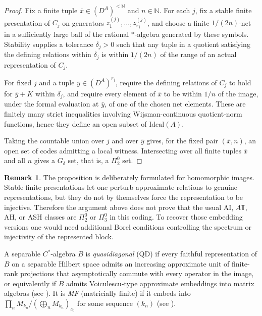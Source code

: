 \documentclass[12pt,fleqn,a4paper]{amsart}
\numberwithin{equation}{section}
\theoremstyle{definition}
\newtheorem{remark}[theorem]{Remark}
\newcommand{\N}{\mathbb{N}}
\newcommand{\Ideal}{\mathrm{Ideal}}
\begin{document}
\begin{proof}
Fix a finite tuple $\bar x\in(D^A)^{<\N}$ and $n\in\N$.  For each $j$, fix a stable
finite presentation of $C_j$ on generators $z^{(j)}_1,\dots,z^{(j)}_{r_j}$, and choose a
finite $1/(2n)$-net in a sufficiently large ball of the rational $*$-algebra generated
by these symbols.  Stability supplies a tolerance $\delta_j>0$ such that any tuple in a
quotient satisfying the defining relations within $\delta_j$ is within $1/(2n)$ of the
range of an actual representation of $C_j$.

For fixed $j$ and a tuple $\bar y\in(D^A)^{r_j}$, require the defining relations of
$C_j$ to hold for $\bar y+K$ within $\delta_j$, and require every element of $\bar x$ to
be within $1/n$ of the image, under the formal evaluation at $\bar y$, of one of the
chosen net elements.  These are finitely many strict inequalities involving
Wijsman-continuous quotient-norm functions, hence they define an open subset of
$\Ideal(A)$.

Taking the countable union over $j$ and over $\bar y$ gives, for the fixed pair
$(\bar x,n)$, an open set of codes admitting a local witness.  Intersecting over all
finite tuples $\bar x$ and all $n$ gives a $G_\delta$ set, that is, a $\Pi^0_2$ set.
\end{proof}

\begin{remark}
The proposition is deliberately formulated for homomorphic images.  Stable finite
presentations let one perturb approximate relations to genuine representations, but
they do not by themselves force the representation to be injective.  Therefore the
argument above does not prove that the usual AI, $A\mathbb T$, AH, or ASH classes are
$\Pi^0_2$ or $\Pi^0_3$ in this coding.  To recover those embedding versions one would
need additional Borel conditions controlling the spectrum or injectivity of the
represented block.
\end{remark}

A separable $C^*$-algebra $B$ is \emph{quasidiagonal} (QD) if every faithful
representation of $B$ on a separable Hilbert space admits an increasing approximate
unit of finite-rank projections that asymptotically commute with every operator in
the image, or equivalently if $B$ admits Voiculescu-type approximate embeddings into
matrix algebras (see \cite[V.4.2.1]{BlackadarOA}).
It is \emph{MF} (matricially finite) if it embeds into
$\prod_n M_{k_n}/(\bigoplus_n M_{k_n})_{c_0}$
for some sequence $(k_n)$
(see \cite[V.4.3.1]{BlackadarOA}).
\end{document}
